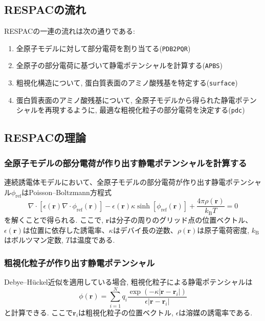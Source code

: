 \subsection{RESPACの流れ}
RESPACの一連の流れは次の通りである:
\begin{enumerate}
    \item 全原子モデルに対して部分電荷を割り当てる(\texttt{PDB2PQR})
    \item 全原子の部分電荷に基づいて静電ポテンシャルを計算する(\texttt{APBS})
    \item 粗視化構造について, 蛋白質表面のアミノ酸残基を特定する(\texttt{surface})
    \item 蛋白質表面のアミノ酸残基について, 全原子モデルから得られた静電ポテンシャルを再現するように, 最適な粗視化粒子の部分電荷を決定する(\texttt{pdc})
\end{enumerate}

\subsection{RESPACの理論}
\subsubsection{全原子モデルの部分電荷が作り出す静電ポテンシャルを計算する}
連続誘電体モデルにおいて、全原子モデルの部分電荷が作り出す静電ポテンシャル$\phi_{\mathrm{ref}}$はPoisson–Boltzmann方程式
\begin{equation}
    \nabla \cdot
    \left[
        \epsilon(\bm{r}) \nabla \cdot \phi_{\mathrm{ref}}(\bm{r})
    \right]
    -
    \epsilon(\bm{r}) \kappa \sinh[\phi_{\mathrm{ref}}(\bm{r})]
    +
    \frac{4 \pi \rho(\bm{r})}{k_{\mathrm{B}}T}
    =
    0
\end{equation}
を解くことで得られる.
ここで, $\bm{r}$は分子の周りのグリッド点の位置ベクトル、$\epsilon(\bm{r})$は位置に依存した誘電率、$\kappa$はデバイ長の逆数、$\rho(\bm{r})$は原子電荷密度, $k_{\mathrm{B}}$はボルツマン定数,
$T$は温度である.

\subsubsection{粗視化粒子が作り出す静電ポテンシャル}
Debye--H\"{u}ckel近似を適用している場合, 粗視化粒子による静電ポテンシャルは
\begin{equation}
    \phi(\bm{r})
    =
    \sum_{i=1}^{N}
    q_{i}
    \frac{\exp(-\kappa |\bm{r} - \bm{r}_{i}|)}{\epsilon |\bm{r} - \bm{r}_{i}|}
\end{equation}
と計算できる.
ここで$\bm{r}_{i}$は粗視化粒子の位置ベクトル, $\epsilon$は溶媒の誘電率である.

